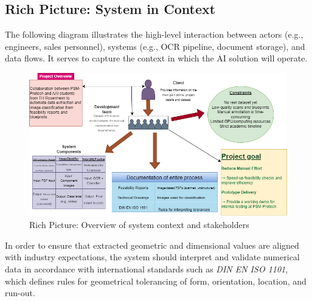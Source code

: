 \documentclass[12pt]{article}
\begin{document}
\subsection*{Rich Picture: System in Context}

The following diagram illustrates the high-level interaction between actors (e.g., engineers, sales personnel), systems (e.g., OCR pipeline, document storage), and data flows. It serves to capture the context in which the AI solution will operate.

\begin{figure}[ht]
    \centering
    \includegraphics[width=\textwidth]{Rich-Picure.drawio.png}
    \caption{Rich Picture: Overview of system context and stakeholders}
    \label{fig:rich_picture}
\end{figure}

\vspace{1em}
\noindent
In order to ensure that extracted geometric and dimensional values are aligned with industry expectations,
the system should interpret and validate numerical data in accordance with international standards such as
\textit{DIN EN ISO 1101}, which defines rules for geometrical tolerancing of form, orientation, location, and run-out.
\end{document}
